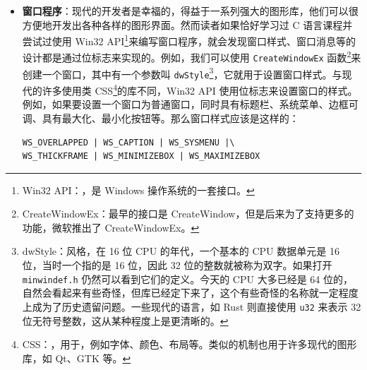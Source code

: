 \begin{itemize}
    \item \textbf{窗口程序}：现代的开发者是幸福的，得益于一系列强大的图形库，他们可以很方便地开发出各种各样的图形界面。然而读者如果恰好学习过 C 语言课程并尝试过使用 Win32 API\footnote{Win32 API：，是 Windows 操作系统的一套接口。}来编写窗口程序，就会发现窗口样式、窗口消息等的设计都是通过位标志来实现的。例如，我们可以使用 \texttt{CreateWindowEx} 函数\footnote{CreateWindowEx：最早的接口是 CreateWindow，但是后来为了支持更多的功能，微软推出了 CreateWindowEx。}来创建一个窗口，其中有一个参数叫 \texttt{dwStyle}\footnote{dwStyle：风格，在 16 位 CPU 的年代，一个基本的 CPU 数据单元是 16 位，当时一个指的是 16 位，因此 32 位的整数就被称为双字。如果打开 \texttt{minwindef.h} 仍然可以看到它们的定义。今天的 CPU 大多已经是 64 位的，自然会看起来有些奇怪，但库已经定下来了，这个有些奇怪的名称就一定程度上成为了历史遗留问题。一些现代的语言，如 Rust 则直接使用 \texttt{u32} 来表示 32 位无符号整数，这从某种程度上是更清晰的。}，它就用于设置窗口样式。与现代的许多使用类 CSS\footnote{CSS：，用于，例如字体、颜色、布局等。类似的机制也用于许多现代的图形库，如 Qt、GTK 等。}的库不同，Win32 API 使用位标志来设置窗口的样式。例如，如果要设置一个窗口为普通窗口，同时具有标题栏、系统菜单、边框可调、具有最大化、最小化按钮等。那么窗口样式应该是这样的：
          \begin{verbatim}
WS_OVERLAPPED | WS_CAPTION | WS_SYSMENU |\
WS_THICKFRAME | WS_MINIMIZEBOX | WS_MAXIMIZEBOX
    \end{verbatim}


\end{itemize}
